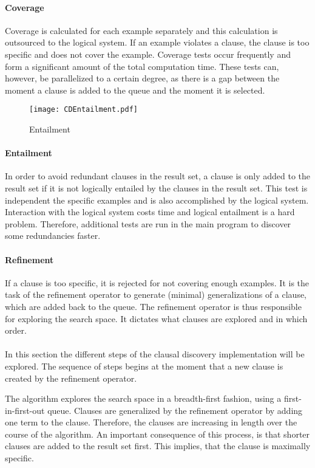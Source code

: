 \paragraph{Coverage} 
Coverage is calculated for each example separately and this calculation is outsourced to the logical system.
If an example violates a clause, the clause is too specific and does not cover the example.
Coverage tests occur frequently and form a significant amount of the total computation time.
These tests can, however, be parallelized to a certain degree, as there is a gap between the moment a clause is added to the queue and the moment it is selected.

\begin{figure}[!htp]

	\caption{Entailment}
	\centering
		\texttt{[image: CDEntailment.pdf]}
	\label{fig:cd_entailment}

\end{figure}


\paragraph{Entailment}
In order to avoid redundant clauses in the result set, a clause is only added to the result set if it is not logically entailed by the clauses in the result set.
This test is independent the specific examples and is also accomplished by the logical system.
Interaction with the logical system costs time and logical entailment is a hard problem.
Therefore, additional tests are run in the main program to discover some redundancies faster.

\paragraph{Refinement}
If a clause is too specific, it is rejected for not covering enough examples.
It is the task of the refinement operator to generate (minimal) generalizations of a clause, which are added back to the queue.
The refinement operator is thus responsible for exploring the search space.
It dictates what clauses are explored and in which order.
\\\\
In this section the different steps of the clausal discovery implementation will be explored.
The sequence of steps begins at the moment that a new clause is created by the refinement operator.

The algorithm explores the search space in a breadth-first fashion, using a first-in-first-out queue.
Clauses are generalized by the refinement operator by adding one term to the clause.
Therefore, the clauses are increasing in length over the course of the algorithm.
An important consequence of this process, is that shorter clauses are added to the result set first.
This implies, that the clause is maximally specific.

